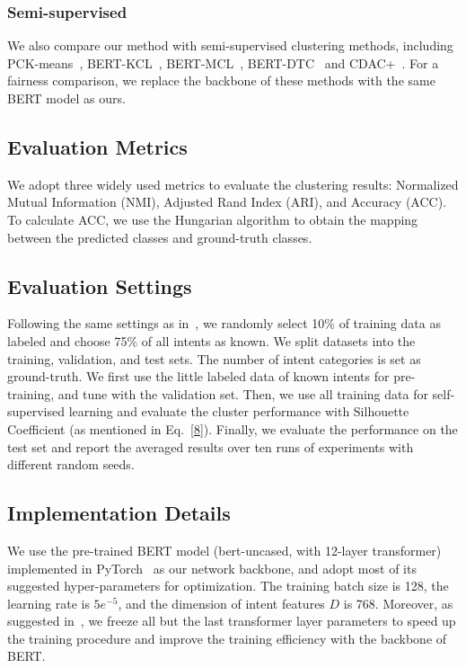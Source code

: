 \documentclass[letterpaper]{article} \usepackage{aaai21}  \usepackage{times}  \usepackage{helvet} \usepackage{courier}  \usepackage[hyphens]{url}  \usepackage{graphicx} \urlstyle{rm} \def\UrlFont{\rm}  \usepackage{natbib}  \usepackage{caption} \frenchspacing  \setlength{\pdfpagewidth}{8.5in}  \setlength{\pdfpageheight}{11in}  \usepackage{amsmath}
\begin{document}
	\subsubsection{Semi-supervised}
	We also compare our method with semi-supervised clustering methods, including PCK-means~\cite{basu2004active}, BERT-KCL~\cite{hsu2018learning}, BERT-MCL~\cite{hsu2018multiclass}, BERT-DTC~\cite{Han2019learning} and  CDAC+~\cite{lin2020discovering}. For a fairness comparison, we replace the backbone of these methods with the same BERT model as ours.
	
	\subsection{Evaluation Metrics}
	We adopt three widely used metrics to evaluate the clustering results: Normalized Mutual Information (NMI), Adjusted Rand Index (ARI), and Accuracy (ACC). To calculate ACC, we use the Hungarian algorithm to obtain the mapping between the predicted classes and ground-truth classes.
	
	\subsection{Evaluation Settings}
	Following the same settings as in~\cite{lin2020discovering}, we randomly select 10\% of training data as labeled and choose 75\% of all intents as known. We split datasets into the training, validation, and test sets. The number of intent categories is set as ground-truth. We first use the little labeled data of known intents for pre-training, and tune with the validation set. Then, we use all training data for self-supervised learning and evaluate the cluster performance with Silhouette Coefficient (as mentioned in Eq.~\ref{8}). Finally, we evaluate the performance on the test set and report the averaged results over ten runs of experiments with different random seeds.
	\subsection{Implementation Details}
	We use the pre-trained BERT model (bert-uncased, with 12-layer transformer) implemented in PyTorch~\cite{Wolf2019HuggingFacesTS} as our network backbone, and adopt most of its suggested hyper-parameters for optimization. The training batch size is 128, the learning rate is $5e^{-5}$, and the dimension of intent features $D$ is 768. Moreover, as suggested in~\cite{lin2020discovering},  we freeze all but the last transformer layer parameters to speed up the training procedure and improve the training efficiency with the backbone of BERT. 
	
\end{document}
